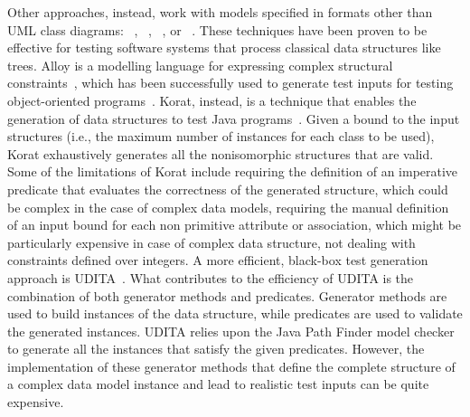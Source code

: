 Other approaches, instead, work with models specified in formats other than UML class diagrams:
~\cite{Boyapati-KORAT-ISSTA-2002,gligoric2010test}, ~\cite{Senni-CPLgeneration-TAP-2012}, ~\cite{Khurshid-SpecificationBasedTesting-ASE-2004}, or ~\cite{Horcher-Z-1995}.
These techniques have been proven to be effective for testing software systems that process classical data structures like trees. 
Alloy is a modelling language for expressing complex structural constraints~\cite{Jackson:Alloy:2002},
which has been successfully used to generate test inputs for testing object-oriented programs~\cite{Khurshid-SpecificationBasedTesting-ASE-2004}.
Korat, instead, is a technique that enables the generation of data structures to test Java programs~\cite{Boyapati-KORAT-ISSTA-2002}. Given a bound to the input structures (i.e., the maximum number of instances for each class to be used), Korat exhaustively generates all the nonisomorphic structures that are valid. 
Some of the limitations of Korat include requiring the definition of an imperative predicate that evaluates the correctness of the generated structure, which could be complex in the case of complex data models, requiring the manual definition of an input bound for each non primitive attribute or association, which might be particularly expensive in case of complex data structure,  not dealing with constraints defined over integers.
A more efficient, black-box test generation approach is UDITA~\cite{gligoric2010test}.
What contributes to the efficiency of UDITA is the combination of both generator methods and predicates.
Generator methods are used to build instances of the data structure, while predicates are used to validate the generated instances. UDITA relies upon the Java Path Finder model checker~\cite{Visser-JPF-2004} to generate all the instances that satisfy the given predicates. However, the implementation of these generator methods that define the complete structure of a complex data model instance and lead to realistic test inputs can be quite expensive. 

